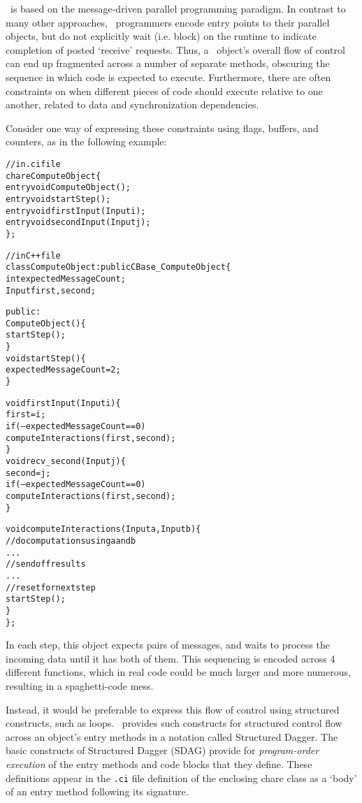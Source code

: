 \charmpp\ is based on the message-driven parallel programming paradigm. In
contrast to many other approaches, \charmpp\ programmers encode entry points to
their parallel objects, but do not explicitly wait (i.e. block) on the runtime
to indicate completion of posted `receive' requests. Thus, a \charmpp\ object's
overall flow of control can end up fragmented across a number of separate
methods, obscuring the sequence in which code is expected to
execute. Furthermore, there are often constraints on when different pieces of
code should execute relative to one another, related to data and
synchronization dependencies.

Consider one way of expressing these constraints using flags, buffers, and
counters, as in the following example:
%
\begin{center}
\begin{alltt}
// in .ci file
chare ComputeObject \{
  entry void ComputeObject();
  entry void startStep();
  entry void firstInput(Input i);
  entry void secondInput(Input j);
\};

// in C++ file
class ComputeObject : public CBase_ComputeObject \{
  int   expectedMessageCount;
  Input first, second;

public:
  ComputeObject() \{
    startStep();
  \}
  void startStep() \{
    expectedMessageCount = 2;
  \}

  void firstInput(Input i) \{
    first = i;
    if (--expectedMessageCount == 0)
      computeInteractions(first, second);
    \}
  void recv_second(Input j) \{
    second = j;
    if (--expectedMessageCount == 0)
      computeInteractions(first, second);
  \}

  void computeInteractions(Input a, Input b) \{
    // do computations using a and b
    . . .
    // send off results
    . . .
    // reset for next step
    startStep();
  \}
\};
\end{alltt}
\end{center}
In each step, this object expects pairs of messages, and waits to process the
incoming data until it has both of them. This sequencing is encoded across 4
different functions, which in real code could be much larger and more numerous,
resulting in a spaghetti-code mess.

Instead, it would be preferable to express this flow of control using
structured constructs, such as loops. \charmpp\ provides such constructs for
structured control flow across an object's entry methods in a notation called
Structured Dagger. The basic constructs of Structured Dagger (SDAG) provide for
\emph{program-order execution} of the entry methods and code blocks that they
define. These definitions appear in the {\tt .ci} file definition of the
enclosing chare class as a `body' of an entry method following its signature.

